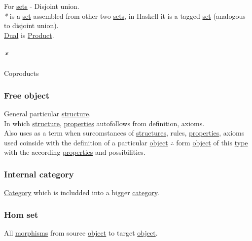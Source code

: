 \documentclass[11pt]{article}
\begin{document}
For \hyperref[org4e7443a]{sets} - Disjoint union.\\

\emph{*} is a \hyperref[orgbed80ba]{set} assembled from other two \hyperref[org4e7443a]{sets}, in Haskell it is a tagged \hyperref[orgbed80ba]{set} (analogous to disjoint union).\\

\hyperref[org0a6da4c]{Dual} is \hyperref[orga3d1454]{Product}.\\

\paragraph{\emph{*}}
\label{sec:org3a4cc2e}

\label{orga1cc64a}Coproducts\\

\subsubsection{\label{orge73011b}Free object}
\label{sec:org3697871}
General particular \hyperref[org93ee82c]{structure}.\\
In which \hyperref[org93ee82c]{structure}, \hyperref[org763ad6b]{properties} autofollows from definition, axioms.\\

Also uses as a term when surcomstances of \hyperref[org51d1eff]{structures}, rules, \hyperref[org763ad6b]{properties}, axioms used coinside with the definition of a particular \hyperref[org025aac8]{object} \(\therefore\) form \hyperref[org025aac8]{object} of this \hyperref[org4fbaeb8]{type} with the according \hyperref[org763ad6b]{properties} and possibilities.\\

\subsubsection{\label{org6a3c5e6}Internal category}
\label{sec:orgb242bbe}
\hyperref[org3e3a79b]{Category} which is includded into a bigger \hyperref[org3e3a79b]{category}.\\

\subsubsection{\label{org2ab6a0f}Hom set}
\label{sec:org147c973}
All \hyperref[org8ed0ce8]{morphisms} from source \hyperref[org025aac8]{object} to target \hyperref[org025aac8]{object}.\\
\end{document}
